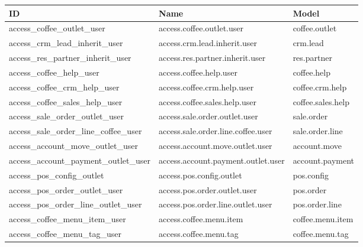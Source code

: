 \begin{table}[H]
\centering
\begin{tabular}{|p{6cm}|p{6cm}|p{5cm}|}
\hline
\textbf{ID} & \textbf{Name} & \textbf{Model} \\
\hline
access\_coffee\_outlet\_user & access.coffee.outlet.user & coffee.outlet \\
access\_crm\_lead\_inherit\_user & access.crm.lead.inherit.user & crm.lead \\
access\_res\_partner\_inherit\_user & access.res.partner.inherit.user & res.partner \\
access\_coffee\_help\_user & access.coffee.help.user & coffee.help \\
access\_coffee\_crm\_help\_user & access.coffee.crm.help.user & coffee.crm.help \\
access\_coffee\_sales\_help\_user & access.coffee.sales.help.user & coffee.sales.help \\
access\_sale\_order\_outlet\_user & access.sale.order.outlet.user & sale.order \\
access\_sale\_order\_line\_coffee\_user & access.sale.order.line.coffee.user & sale.order.line \\
access\_account\_move\_outlet\_user & access.account.move.outlet.user & account.move \\
access\_account\_payment\_outlet\_user & access.account.payment.outlet.user & account.payment \\
access\_pos\_config\_outlet & access.pos.config.outlet & pos.config \\
access\_pos\_order\_outlet\_user & access.pos.order.outlet.user & pos.order \\
access\_pos\_order\_line\_outlet\_user & access.pos.order.line.outlet.user & pos.order.line \\
access\_coffee\_menu\_item\_user & access.coffee.menu.item & coffee.menu.item \\
access\_coffee\_menu\_tag\_user & access.coffee.menu.tag & coffee.menu.tag \\
\hline
\end{tabular}

\end{table}

